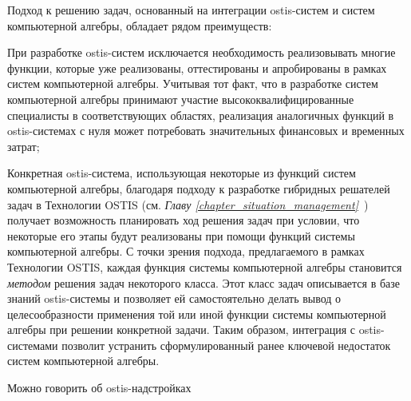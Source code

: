 Подход к решению задач, основанный на интеграции ostis-систем и систем компьютерной алгебры, обладает рядом преимуществ:
\begin{textitemize}
	\item При разработке ostis-систем исключается необходимость реализовывать многие функции, которые уже реализованы, оттестированы и апробированы в рамках систем компьютерной алгебры. Учитывая тот факт, что в разработке систем компьютерной алгебры принимают участие высококвалифицированные специалисты в соответствующих областях, реализация аналогичных функций в ostis-системах с нуля может потребовать значительных финансовых и временных затрат;
	\item Конкретная ostis-система, использующая некоторые из функций систем компьютерной алгебры, благодаря подходу к разработке гибридных решателей задач в Технологии OSTIS (см. \textit{Главу \ref{chapter_situation_management}~}) получает возможность  планировать ход решения задач при условии, что некоторые его этапы будут реализованы при помощи функций системы компьютерной алгебры. С точки зрения подхода, предлагаемого в рамках Технологии OSTIS, каждая функция системы компьютерной алгебры становится \textit{методом} решения задач некоторого класса. Этот класс задач описывается в базе знаний ostis-системы и позволяет ей самостоятельно делать вывод о целесообразности применения той или иной функции системы компьютерной алгебры при решении конкретной задачи. Таким образом, интеграция с ostis-системами позволит устранить сформулированный ранее ключевой недостаток систем компьютерной алгебры.
\end{textitemize}

Можно говорить об ostis-надстройках

